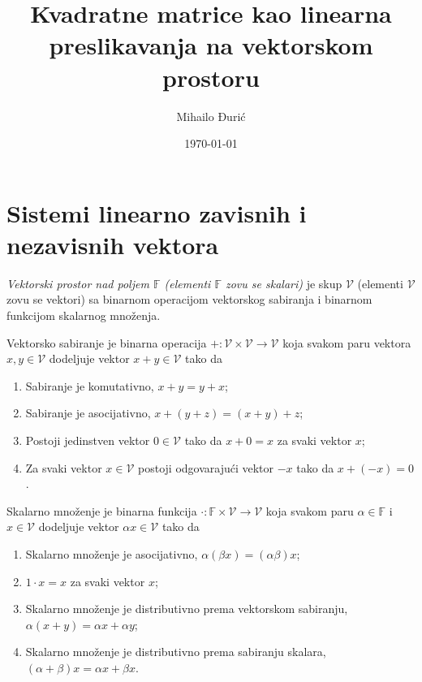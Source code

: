 \documentclass{article}
\title{Kvadratne matrice kao linearna preslikavanja na vektorskom prostoru}
\author{Mihailo Đurić}
\date{\today}
\begin{document}
\maketitle
\tableofcontents
\newpage

\section{Sistemi linearno zavisnih i nezavisnih vektora}

\begin{definition}
  \textit{Vektorski prostor nad poljem $\mathbb{F}$ (elementi $\mathbb{F}$ zovu se skalari)} je skup $\mathcal{V}$ (elementi $\mathcal{V}$ zovu se vektori) sa binarnom operacijom vektorskog sabiranja i binarnom funkcijom skalarnog množenja.

  Vektorsko sabiranje je binarna operacija $+ : \mathcal{V} \times \mathcal{V} \to \mathcal{V}$ koja svakom paru vektora $x, y \in \mathcal{V}$ dodeljuje vektor $x + y \in \mathcal{V}$ tako da
  \begin{enumerate}
    \item Sabiranje je komutativno, $x + y = y + x$;
    \item Sabiranje je asocijativno, $x + (y + z) = (x + y) + z$;
    \item Postoji jedinstven vektor $0 \in \mathcal{V}$ tako da $x + 0 = x$ za svaki vektor $x$;
    \item Za svaki vektor $x \in \mathcal{V}$ postoji odgovarajući vektor $-x$ tako da $x + (-x) = 0$.
  \end{enumerate}
  
  Skalarno množenje je binarna funkcija $\cdot : \mathbb{F} \times \mathcal{V} \to \mathcal{V}$ koja svakom paru $\alpha \in \mathbb{F}$ i $x \in \mathcal{V}$ dodeljuje vektor $\alpha x \in \mathcal{V}$ tako da
  \begin{enumerate}
    \item Skalarno množenje je asocijativno, $\alpha (\beta x) = (\alpha \beta) x$;
    \item $1 \cdot x = x$ za svaki vektor $x$;
    \item Skalarno množenje je distributivno prema vektorskom sabiranju, $\alpha (x + y) = \alpha x + \alpha y$;
    \item Skalarno množenje je distributivno prema sabiranju skalara, $(\alpha + \beta) x = \alpha x + \beta x$.
  \end{enumerate}
\end{definition}
\end{document}
